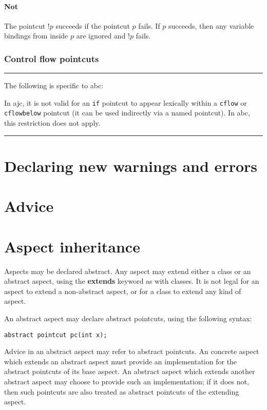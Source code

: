 \documentclass[12pt,a4paper]{report}
\newcommand\abcdistinctionbegin[0]{%
\hrule
\noindent
The following is specific to abc:

\noindent
}
\newcommand\abcdistinctionend[0]{%
\hrule
}
\def\ajnot{!}
\begin{document}
\subsubsection{Not}

The pointcut $\ajnot p$ succeeds if the pointcut $p$ fails. If $p$
succeeds, then any variable bindings from inside $p$ are ignored 
and $\ajnot p$ fails.

\subsection{Control flow pointcuts}

\abcdistinctionbegin
In ajc, it is not valid for an \verb|if| pointcut to appear lexically
within a \verb|cflow| or \verb|cflowbelow| pointcut (it can be used
indirectly via a named pointcut). In abc, this restriction does not apply.
\abcdistinctionend


\chapter{Declaring new warnings and errors}

\chapter{Advice}

\chapter{Aspect inheritance}
Aspects may be declared abstract. Any aspect may extend either a class
or an abstract aspect, using the {\bf extends} keyword as with classes.
It is not legal for an aspect to extend a non-abstract aspect, or
for a class to extend any kind of aspect.

An abstract aspect may declare abstract pointcuts, using the following
syntax:

\begin{verbatim}
abstract pointcut pc(int x);
\end{verbatim}

Advice in an abstract
aspect may refer to abstract pointcuts. An concrete 
aspect which extends an abstract
aspect must provide an implementation for the abstract pointcuts of its
base aspect. An abstract aspect which extends another abstract aspect
may choose to provide such an implementation; if it does not, then 
such pointcuts are also treated as abstract pointcuts of the extending aspect.
\end{document}
